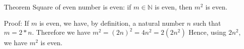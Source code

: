 Theorem Square of even number is even: 
if $m \in \mathbb{N}$ is even, then $m^2$ is even.


Proof:
If $m$ is even, we have, by definition, a natural number $n$ such that $m = 2 * n$.
Therefore we have $m^2 = (2n)^2 = 4n^2 = 2 (2n^2)$
Hence, using $2n^2$, we have $m^2$ is even.